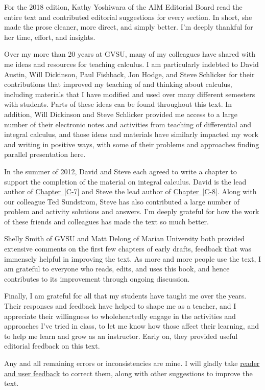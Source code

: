 \documentclass[10pt,]{book}
\theoremstyle{plain}
\theoremstyle{definition}
\theoremstyle{definition}
\theoremstyle{definition}
\theoremstyle{definition}
\numberwithin{equation}{section}
\begin{document}
\par
\hypertarget{p-4}{}%
For the 2018 edition, Kathy Yoshiwara of the AIM Editorial Board read the entire text and contributed editorial suggestions for every section. In short, she made the prose cleaner, more direct, and simply better. I'm deeply thankful for her time, effort, and insights.%
\par
\hypertarget{p-5}{}%
Over my more than 20 years at GVSU, many of my colleagues have shared with me ideas and resources for teaching calculus. I am particularly indebted to David Austin, Will Dickinson, Paul Fishback, Jon Hodge, and Steve Schlicker for their contributions that improved my teaching of and thinking about calculus, including materials that I have modified and used over many different semesters with students. Parts of these ideas can be found throughout this text. In addition, Will Dickinson and Steve Schlicker provided me access to a large number of their electronic notes and activities from teaching of differential and integral calculus, and those ideas and materials have similarly impacted my work and writing in positive ways, with some of their problems and approaches finding parallel presentation here.%
\par
\hypertarget{p-6}{}%
In the summer of 2012, David and Steve each agreed to write a chapter to support the completion of the material on integral calculus. David is the lead author of \hyperref[C-7]{Chapter~\ref{C-7}} and Steve the lead author of \hyperref[C-8]{Chapter~\ref{C-8}}. Along with our colleague Ted Sundstrom, Steve has also contributed a large number of problem and activity solutions and answers. I'm deeply grateful for how the work of these friends and colleagues has made the text so much better.%
\par
\hypertarget{p-7}{}%
Shelly Smith of GVSU and Matt Delong of Marian University both provided extensive comments on the first few chapters of early drafts, feedback that was immensely helpful in improving the text. As more and more people use the text, I am grateful to everyone who reads, edits, and uses this book, and hence contributes to its improvement through ongoing discussion.%
\par
\hypertarget{p-8}{}%
Finally, I am grateful for all that my students have taught me over the years. Their responses and feedback have helped to shape me as a teacher, and I appreciate their willingness to wholeheartedly engage in the activities and approaches I've tried in class, to let me know how those affect their learning, and to help me learn and grow as an instructor. Early on, they provided useful editorial feedback on this text.%
\par
\hypertarget{p-9}{}%
Any and all remaining errors or inconsistencies are mine. I will gladly take \href{http://gvsu.edu/s/0vK}{reader and user feedback} to correct them, along with other suggestions to improve the text.%
\end{document}
